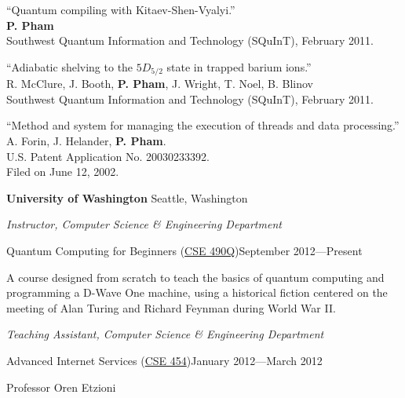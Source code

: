 \documentclass[letter]{article}
\begin{document}
\vspace{\baselineskip}
\par
``Quantum compiling with Kitaev-Shen-Vyalyi.''\\
\textbf{P. Pham}\\
Southwest Quantum Information and Technology (SQuInT), February 2011.

\vspace{\baselineskip}
\par
``Adiabatic shelving to the $5D_{5/2}$ state in trapped barium ions.''\\
R. McClure, J. Booth, \textbf{P. Pham}, J. Wright, T. Noel, B. Blinov\\
Southwest Quantum Information and Technology (SQuInT), February 2011.

\vspace{\baselineskip}

``Method and system for managing the execution of threads and data processing.''
\\
A. Forin, J. Helander, \textbf{P. Pham}.\\
U.S. Patent Application No. 20030233392.\\
Filed on June 12, 2002.

\pagebreak

{\bf University of Washington} \hfill Seattle, Washington

\par
{\em Instructor, Computer Science \& Engineering Department}

\vspace{0.5\baselineskip}
\par
Quantum Computing for Beginners (\href{http://www.cs.washington.edu/education/courses/490q/12au/}{CSE 490Q})\hfill September 2012---Present
\par
A course designed from scratch to teach the basics of quantum computing and
programming a D-Wave One machine, using a historical fiction centered on
the meeting of Alan Turing and Richard Feynman during World War II.

\vspace{0.5\baselineskip}
\par
{\em Teaching Assistant, Computer Science \& Engineering Department}

\vspace{0.5\baselineskip}
\par
Advanced Internet Services (\href{http://www.cs.washington.edu/education/courses/454/12wi/}{CSE 454})\hfill January 2012---March 2012
\par
Professor Oren Etzioni
\end{document}
